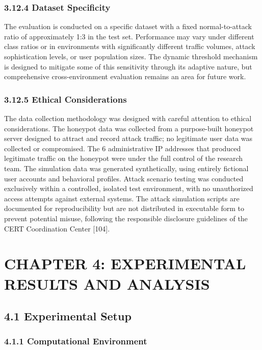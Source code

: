 \documentclass[
  a4paper]{report}
\begin{document}
\subsection{3.12.4 Dataset Specificity}\label{dataset-specificity}

The evaluation is conducted on a specific dataset with a fixed
normal-to-attack ratio of approximately 1:3 in the test set. Performance
may vary under different class ratios or in environments with
significantly different traffic volumes, attack sophistication levels,
or user population sizes. The dynamic threshold mechanism is designed to
mitigate some of this sensitivity through its adaptive nature, but
comprehensive cross-environment evaluation remains an area for future
work.

\subsection{3.12.5 Ethical Considerations}\label{ethical-considerations}

The data collection methodology was designed with careful attention to
ethical considerations. The honeypot data was collected from a
purpose-built honeypot server designed to attract and record attack
traffic; no legitimate user data was collected or compromised. The 6
administrative IP addresses that produced legitimate traffic on the
honeypot were under the full control of the research team. The
simulation data was generated synthetically, using entirely fictional
user accounts and behavioral profiles. Attack scenario testing was
conducted exclusively within a controlled, isolated test environment,
with no unauthorized access attempts against external systems. The
attack simulation scripts are documented for reproducibility but are not
distributed in executable form to prevent potential misuse, following
the responsible disclosure guidelines of the CERT Coordination Center
{[}104{]}.

\chapter{CHAPTER 4: EXPERIMENTAL RESULTS AND
ANALYSIS}\label{chapter-4-experimental-results-and-analysis}

\section{4.1 Experimental Setup}\label{experimental-setup}

\subsection{4.1.1 Computational
Environment}\label{computational-environment}
\end{document}
